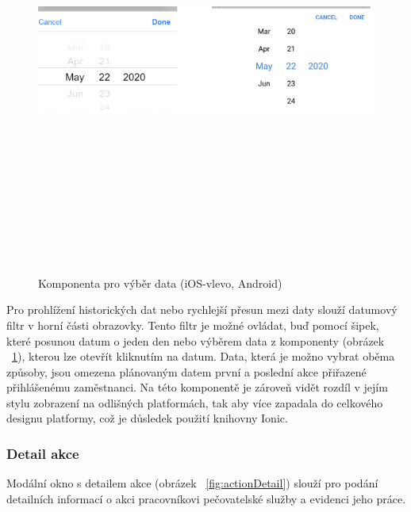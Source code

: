 \documentclass[
  biblatex,
  glossaries,
  index
]{kidiplom}
\begin{document}
\begin{figure}[H]
  	\centering
 	 \includegraphics[width=14cm,height=14cm,keepaspectratio]{datepicker}
 	 \caption{Komponenta pro výběr data (iOS-vlevo, Android)}
 	 \label{fig:datepicker}
\end{figure}

Pro prohlížení historických dat nebo rychlejší přesun mezi daty slouží datumový filtr v horní části obrazovky. Tento filtr je možné ovládat, buď pomocí šipek, které posunou datum o jeden den nebo výběrem data z komponenty (obrázek ~\ref{fig:datepicker}), kterou lze otevřít kliknutím na datum. Data, která je možno vybrat oběma způsoby, jsou omezena plánovaným datem první a poslední akce přiřazené přihlášenému zaměstnanci. Na této komponentě je zároveň vidět rozdíl v jejím stylu zobrazení na odlišných platformách, tak aby více zapadala do celkového designu platformy, což je důsledek použití knihovny Ionic.

\subsubsection{Detail akce}
\label{sec:actionDetail}
Modální okno s detailem akce (obrázek ~\ref{fig:actionDetail}) slouží pro podání detailních informací o akci pracovníkovi pečovatelské služby a evidenci jeho práce.
\end{document}
